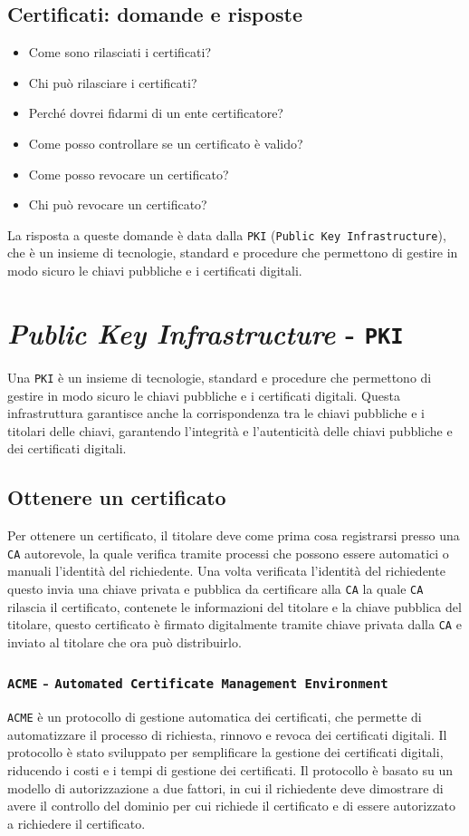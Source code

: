     \subsection{Certificati: domande e risposte}
        \begin{itemize}
            \item Come sono rilasciati i certificati?
            \item Chi può rilasciare i certificati?
            \item Perché dovrei fidarmi di un ente certificatore?
            \item Come posso controllare se un certificato è valido?
            \item Come posso revocare un certificato?
            \item Chi può revocare un certificato?
        \end{itemize}
        La risposta a queste domande è data dalla \texttt{PKI} (\texttt{Public Key Infrastructure}), che è un insieme di tecnologie, standard e procedure che permettono di gestire in modo sicuro le chiavi pubbliche e i certificati digitali.
\section{\textit{Public Key Infrastructure} - \texttt{PKI}}
    \label{sec:PKI}
    Una \texttt{PKI} è un insieme di tecnologie, standard e procedure che permettono di gestire in modo sicuro le chiavi pubbliche e i certificati digitali. Questa infrastruttura garantisce anche la corrispondenza tra le chiavi pubbliche e i titolari delle chiavi, garantendo l'integrità e l'autenticità delle chiavi pubbliche e dei certificati digitali.
    \subsection{Ottenere un certificato}
        Per ottenere un certificato, il titolare deve come prima cosa registrarsi presso una \texttt{CA} autorevole, la quale verifica tramite processi che possono essere automatici o manuali l'identità del richiedente. Una volta verificata l'identità del richiedente questo invia una chiave privata e pubblica da certificare alla \texttt{CA} la quale \texttt{CA} rilascia il certificato, contenete le informazioni del titolare e la chiave pubblica del titolare, questo certificato è firmato digitalmente tramite chiave privata dalla \texttt{CA} e inviato al titolare che ora può distribuirlo.
        \subsubsection{\texttt{ACME} - \texttt{Automated Certificate Management Environment}}
            \texttt{ACME} è un protocollo di gestione automatica dei certificati, che permette di automatizzare il processo di richiesta, rinnovo e revoca dei certificati digitali. Il protocollo è stato sviluppato per semplificare la gestione dei certificati digitali, riducendo i costi e i tempi di gestione dei certificati. Il protocollo è basato su un modello di autorizzazione a due fattori, in cui il richiedente deve dimostrare di avere il controllo del dominio per cui richiede il certificato e di essere autorizzato a richiedere il certificato.
